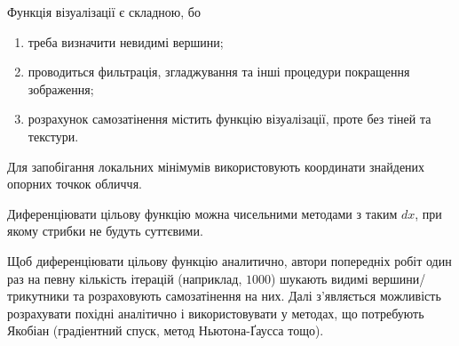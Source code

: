 Функція візуалізації є складною, бо
\begin{enumerate}
  \item
    треба визначити невидимі вершини;
  \item
    проводиться фильтрація,
    згладжування та інші процедури покращення зображення;
  \item
    розрахунок самозатінення містить функцію візуалізації,
    проте без тіней та текстури.
\end{enumerate}

Для запобігання локальних мінімумів
використовують координати знайдених опорних точкок обличчя.

Диференціювати цільову функцію можна чисельними методами з таким $dx$,
при якому стрибки не будуть суттєвими.

Щоб диференціювати цільову функцію аналитично,
автори попередніх робіт один раз на певну кількість ітерацій
(наприклад, $1000$)
шукають видимі вершини/трикутники та розраховують самозатінення на них.
Далі з'являється можливість розрахувати похідні аналітично
і використовувати у методах, що потребують Якобіан
(градіентний спуск, метод Ньютона-Ґаусса тощо).
